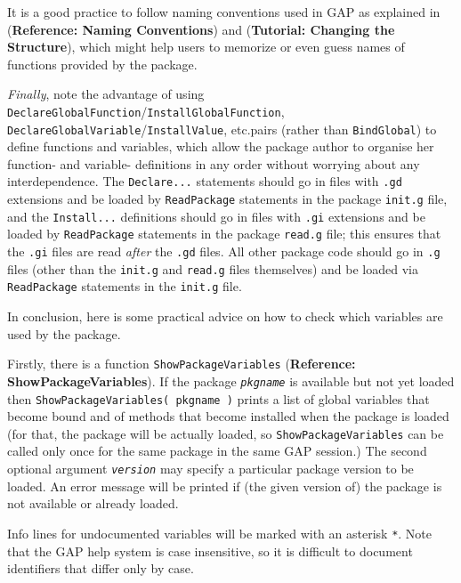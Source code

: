 \documentclass[a4paper,11pt]{report}
\begin{document}
{{ It is a good practice to follow naming conventions used in \textsf{GAP} as explained in  (\textbf{Reference: Naming Conventions}) and  (\textbf{Tutorial: Changing the Structure}), which might help users to memorize or even guess names of functions provided
by the package. 

 \emph{Finally}, note the advantage of using \texttt{DeclareGlobalFunction}/\texttt{InstallGlobalFunction}, \texttt{DeclareGlobalVariable}/\texttt{InstallValue}, etc.{\nobreakspace}pairs (rather than \texttt{BindGlobal}) to define functions and variables, which allow the package author to
organise her function- and variable- definitions in any order without worrying
about any interdependence. The \texttt{Declare...} statements should go in files with \texttt{.gd} extensions and be loaded by \texttt{ReadPackage} statements in the package \texttt{init.g} file, and the \texttt{Install...} definitions should go in files with \texttt{.gi} extensions and be loaded by \texttt{ReadPackage} statements in the package \texttt{read.g} file; this ensures that the \texttt{.gi} files are read \emph{after} the \texttt{.gd} files. All other package code should go in \texttt{.g} files (other than the \texttt{init.g} and \texttt{read.g} files themselves) and be loaded via \texttt{ReadPackage} statements in the \texttt{init.g} file. 

  In conclusion, here is some practical advice on how to check which variables
are used by the package. 

 Firstly, there is a function \texttt{ShowPackageVariables} (\textbf{Reference: ShowPackageVariables}). If the package \mbox{\texttt{\mdseries\slshape pkgname}} is available but not yet loaded then \texttt{ShowPackageVariables( pkgname )} prints a list of global variables that become bound and of methods that become
installed when the package is loaded (for that, the package will be actually
loaded, so \texttt{ShowPackageVariables} can be called only once for the same package in the same \textsf{GAP} session.) The second optional argument \mbox{\texttt{\mdseries\slshape version}} may specify a particular package version to be loaded. An error message will
be printed if (the given version of) the package is not available or already
loaded. 

 Info lines for undocumented variables will be marked with an asterisk \texttt{*}. Note that the \textsf{GAP} help system is case insensitive, so it is difficult to document identifiers
that differ only by case. 

}}
\end{document}
